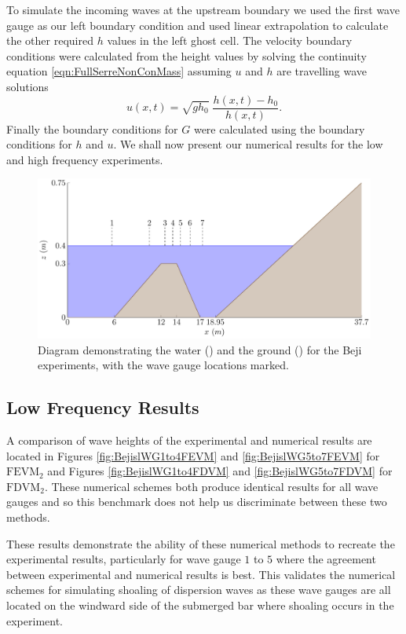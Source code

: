 To simulate the incoming waves at the upstream boundary we used the first wave gauge as our left boundary condition and used linear extrapolation to calculate the other required $h$ values in the left ghost cell. The velocity boundary conditions were calculated from the height values by solving the continuity equation \eqref{eqn:FullSerreNonConMass} assuming $u$ and $h$ are travelling wave solutions
\begin{equation*}
u(x,t) = \sqrt{g h_0} \; \dfrac{h(x,t) - h_0}{h(x,t)}.
\end{equation*}
Finally the boundary conditions for $G$ were calculated using the boundary conditions for $h$ and $u$. We shall now present our numerical results for the low and high frequency experiments.
%
\begin{figure}
	\centering
		\includegraphics[width=\textwidth]{./chp6/figures/Experiment/Beji/BejiTank.pdf}
	\caption{Diagram demonstrating the water () and the ground  () for the Beji experiments, with the wave gauge locations marked.}
	\label{fig:BejiWT}
\end{figure}
%
\subsection{Low Frequency Results}
A comparison of wave heights of the experimental and numerical results are located in Figures \ref{fig:BejislWG1to4FEVM} and \ref{fig:BejislWG5to7FEVM} for $\text{FEVM}_2$ and Figures \ref{fig:BejislWG1to4FDVM} and \ref{fig:BejislWG5to7FDVM} for $\text{FDVM}_2$. These numerical schemes both produce identical results for all wave gauges and so this benchmark does not help us discriminate between these two methods. 

These results demonstrate the ability of these numerical methods to recreate the experimental results, particularly for wave gauge $1$ to $5$ where the agreement between experimental and numerical results is best. This validates the numerical schemes for simulating shoaling of dispersion waves as these wave gauges are all located on the windward side of the submerged bar where shoaling occurs in the experiment. 

